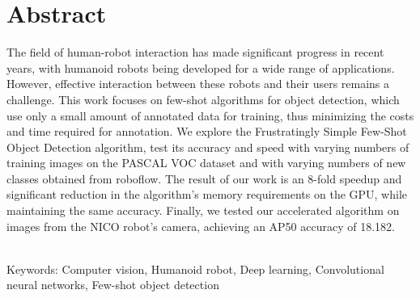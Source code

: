 \documentclass[12pt, a4paper, oneside]{book}
\begin{document}
\chapter*{Abstract}\label{chap:abstract_en}

The field of human-robot interaction has made significant progress in recent years, with humanoid robots being developed for a wide range of applications. However, effective interaction between these robots and their users remains a challenge. This work focuses on few-shot algorithms for object detection, which use only a small amount of annotated data for training, thus minimizing the costs and time required for annotation. We explore the Frustratingly Simple Few-Shot Object Detection algorithm, test its accuracy and speed with varying numbers of training images on the PASCAL VOC dataset and with varying numbers of new classes obtained from roboflow. The result of our work is an 8-fold speedup and significant reduction in the algorithm's memory requirements on the GPU, while maintaining the same accuracy. Finally, we tested our accelerated algorithm on images from the NICO robot's camera, achieving an AP50 accuracy of 18.182.

~\\
Keywords: Computer vision, Humanoid robot, Deep learning, Convolutional neural networks, Few-shot object detection 
\vfill\eject 

\tableofcontents

\mainmatter


% 








\backmatter

\nocite{*}



\listoffigures
\end{document}
